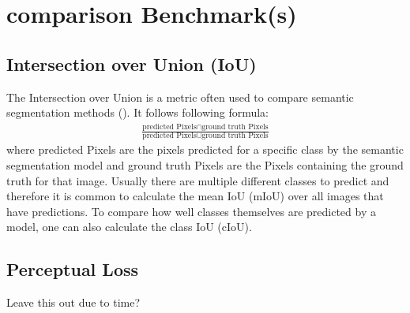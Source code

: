 \section{comparison Benchmark(s)}
\subsection{Intersection over Union (IoU)}
The Intersection over Union is a metric often used to compare semantic segmentation methods (). It follows following formula:
\begin{align*}
	\frac{\text{predicted Pixels} \cap \text{ground truth Pixels}}{\text{predicted Pixels} \cup \text{ground truth Pixels}}
\end{align*}
where predicted Pixels are the pixels predicted for a specific class by the semantic segmentation model and ground truth Pixels are the Pixels containing the ground truth for that image. Usually there are multiple different classes to predict and therefore it is common to calculate the mean IoU (mIoU) over all images that have predictions. To compare how well classes themselves are predicted by a model, one can also calculate the class IoU (cIoU).

\subsection{Perceptual Loss}
Leave this out due to time?
